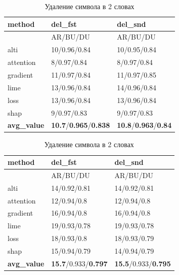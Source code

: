 \begin{table}[H]
  \centering
  \begin{minipage}[t]{0.49\textwidth} %
    \centering
    \caption{Удалание символа в 1 слове}
    {\fontsize{8pt}{15pt}\selectfont
    \begin{tabularx}{\textwidth}{|l|X|X|}
        \hline
         method            & del\_fst          & del\_snd          \\
        \hline
         & AR/BU/DU & AR/BU/DU  \\
        \hline
         alti      & 10/0.96/0.84 & 10/0.95/0.84 \\
        \hline
         attention & 8/0.97/0.84  & 8/0.97/0.84  \\
        \hline
         gradient  & 11/0.97/0.84 & 11/0.97/0.85 \\
        \hline
         lime      & 13/0.96/0.84 & 14/0.96/0.84 \\
        \hline
         loss      & 13/0.96/0.84 & 13/0.96/0.84 \\
        \hline
         shap      & 9/0.97/0.83  & 9/0.97/0.83  \\
        \hline
         \textbf{avg\_value} & \textbf{10.7}/\textbf{0.965}/\textbf{0.838} & \textbf{10.8}/\textbf{0.963}/\textbf{0.84} \\
        \hline
    \end{tabularx}
    }
  \end{minipage}
  \hfill %
  \begin{minipage}[t]{0.49\textwidth} %
    \centering
    \caption{Удаление символа в 2 словах}
    {\fontsize{8pt}{15pt}\selectfont
    \begin{tabularx}{\textwidth}{|l|X|X|}
        \hline
         method            & del\_fst          & del\_snd          \\
        \hline
         & AR/BU/DU & AR/BU/DU  \\
        \hline
         alti      & 14/0.92/0.81 & 14/0.92/0.81 \\
        \hline
         attention & 12/0.94/0.8  & 12/0.94/0.8  \\
        \hline
         gradient  & 16/0.94/0.8  & 16/0.94/0.8  \\
        \hline
         lime      & 19/0.93/0.78 & 19/0.93/0.78 \\
        \hline
         loss      & 18/0.93/0.8 & 18/0.93/0.79 \\
        \hline
         shap      & 15/0.94/0.79 & 14/0.94/0.79 \\
        \hline
         \textbf{avg\_value} & \textbf{15.7}/0.933/\textbf{0.797} & \textbf{15.5}/0.933/\textbf{0.795} \\
        \hline
    \end{tabularx}
    }
  \end{minipage}
\end{table}

